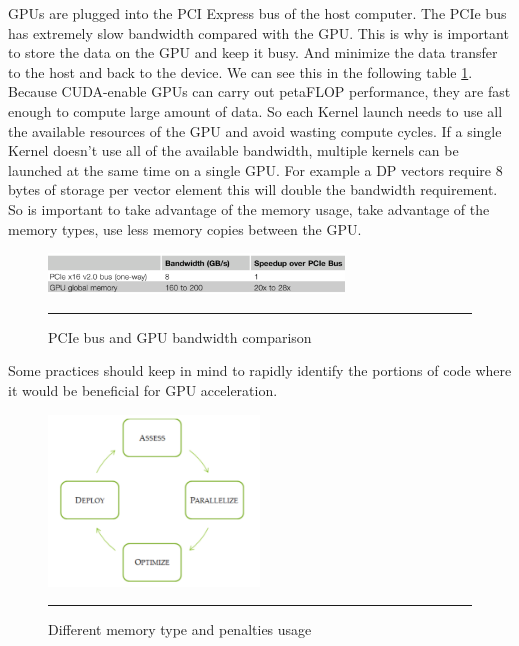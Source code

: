 GPUs are plugged into the PCI Express bus of the host computer. The PCIe bus has extremely slow bandwidth compared with the GPU. This is why is important to store the data on the GPU and keep it busy. And minimize the data transfer to the host and back to the device. We can see this in the following table \ref{fig:PCI}.  Because CUDA-enable GPUs can carry out petaFLOP performance, they are fast enough to compute large amount of data. So each Kernel launch needs to use all the available resources of the GPU and avoid wasting compute cycles. If a single Kernel doesn't use all of the available bandwidth, multiple kernels can be launched at the same time on a single GPU.
For example a DP vectors require 8 bytes of storage per vector element this will double the bandwidth requirement. So is important to take advantage of the memory usage, take advantage of the memory types, use less memory copies between the GPU. \cite{design}

\begin{figure}[htbp]
	\centering
		\includegraphics[width=0.7\textwidth]{Figures/PCI.png}
		\rule{35em}{0.5pt}
	\caption[PCIe Bandwidth]{PCIe bus and GPU bandwidth comparison }
	\label{fig:PCI}
\end{figure}

Some practices should keep in mind to rapidly identify the portions of code where it would be beneficial for GPU acceleration.\cite{practices}

\begin{figure}[htbp]
	\centering
		\includegraphics[width=0.5\textwidth]{Figures/apod.png}
		\rule{35em}{0.5pt}
	\caption[Different memory types]{Different memory type and penalties usage}
	\label{fig:apod}
\end{figure}

